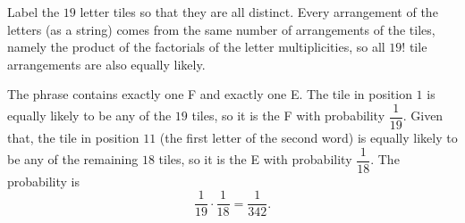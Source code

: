 Label the $19$ letter tiles so that they are all distinct. Every arrangement of the letters (as a string) comes from the same number of arrangements of the tiles, namely the product of the factorials of the letter multiplicities, so all $19!$ tile arrangements are also equally likely.

The phrase contains exactly one F and exactly one E. The tile in position $1$ is equally likely to be any of the $19$ tiles, so it is the F with probability $\dfrac1{19}$. Given that, the tile in position $11$ (the first letter of the second word) is equally likely to be any of the remaining $18$ tiles, so it is the E with probability $\dfrac1{18}$. The probability is
\[\dfrac1{19}\cdot\dfrac1{18}=\boxed{\dfrac1{342}}.\]
